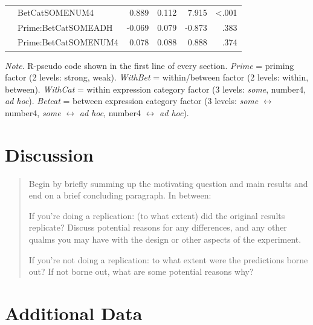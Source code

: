 \documentclass[10pt]{article}
\begin{document}
\begin{multicols}{2}
\begin{table}[ht]
\begin{center}
\begin{tabular}{llrrrr}
      & BetCatSOMENUM4 & 0.889 & 0.112 & 7.915 & <.001 \\
      & Prime:BetCatSOMEADH & -0.069 & 0.079 & -0.873 & .383 \\
      & Prime:BetCatSOMENUM4 & 0.078 & 0.088 & 0.888 & .374 \\
      \hline
    \end{tabular}
\end{center}
\emph{Note}. R-pseudo code shown in the first line of every section.
  \emph{Prime} = priming factor (2 levels: strong, weak).
  \emph{WithBet} = within/between factor (2 levels: within, between).
  \emph{WithCat} = within expression category factor (3 levels: \emph{some}, number4, \emph{ad hoc}).
  \emph{Betcat} = between expression category factor (3 levels: \emph{some} \(\leftrightarrow\) number4, \emph{some} \(\leftrightarrow\) \emph{ad hoc}, number4 \(\leftrightarrow\) \emph{ad hoc}).
\end{table}


\section{Discussion}
\label{sec:discussion}

\begin{quote}
  Begin by briefly summing up the motivating question and main results and end on a brief concluding paragraph. In between:

  If you're doing a replication: (to what extent) did the original results replicate? Discuss potential reasons for any differences, and any other qualms you may have with the design or other aspects of the experiment.

  If you're not doing a replication: to what extent were the predictions borne out? If not borne out, what are some potential reasons why?
\end{quote}

\end{multicols}

\vfill
\printbibliography

\newpage
\appendix
\section{Additional Data}
\end{document}
